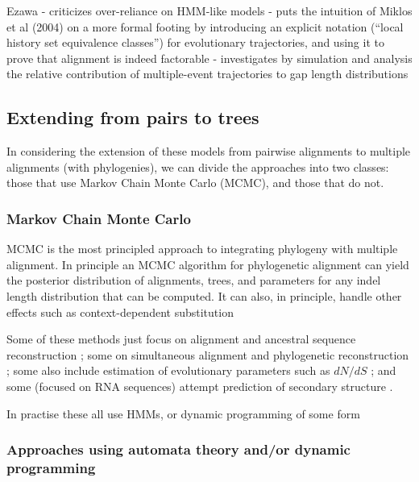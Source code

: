 \documentclass{bmcart}
\begin{document}
Ezawa \cite{Ezawa2016a,Ezawa2016b,Ezawa2016bErratum}
 - criticizes over-reliance on HMM-like models
 - puts the intuition of Miklos et al (2004) on a more formal footing by introducing an explicit notation (``local history set equivalence classes'') for evolutionary trajectories, and using it to prove that alignment is indeed factorable
 - investigates by simulation and analysis the relative contribution of multiple-event trajectories to gap length distributions


\subsection*{Extending from pairs to trees}

In considering the extension of these models from pairwise alignments
to multiple alignments (with phylogenies),
we can divide the approaches into two classes:
those that use Markov Chain Monte Carlo (MCMC), and those that do not.

\subsubsection*{Markov Chain Monte Carlo}

MCMC is the most principled approach to integrating phylogeny with multiple alignment.
In principle an MCMC algorithm for phylogenetic alignment can yield the posterior distribution of
alignments, trees, and parameters for any indel length distribution that can be computed.
It can also, in principle, handle other effects such as context-dependent substitution

Some of these methods just focus on alignment and ancestral sequence reconstruction \cite{HolmesBruno2001};
some on simultaneous alignment and phylogenetic reconstruction
\cite{RedelingsSuchard2005,SuchardRedelings2006,RedelingsSuchard2007,NovakEtAl2008,BouchardCoteEtAl2009,WestessonBarquistHolmes2012};
some also include estimation of evolutionary parameters such as $dN/dS$ \cite{Redelings2014};
and some (focused on RNA sequences) attempt prediction of secondary structure \cite{ArunapuramEtAl2013,MeyerMiklos2007}.

In practise these all use HMMs, or dynamic programming of some form

\subsubsection*{Approaches using automata theory and/or dynamic programming}
\end{document}
